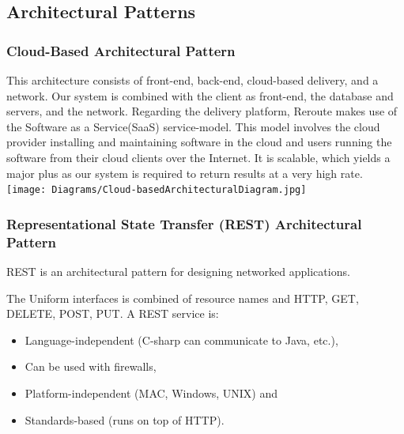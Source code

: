 \documentclass[a4paper,10pt]{article}
\begin{document}
	\subsection{Architectural Patterns}
	\subsubsection{Cloud-Based Architectural Pattern}
	This architecture consists of front-end, back-end, cloud-based delivery, and a network.
	Our system is combined with the client as front-end, the database and servers, and the network. 
	Regarding the delivery platform, Reroute makes use of the Software as a Service(SaaS) service-model. This model involves
	the cloud provider installing and maintaining software in the cloud and users running the software from their cloud clients
	over the Internet. It is scalable, which yields a major plus as our system is required to return results at a very high rate.\\
	
	\texttt{[image: Diagrams/Cloud-basedArchitecturalDiagram.jpg]}\\

	\subsubsection{Representational State Transfer (REST) Architectural Pattern}
	REST is an architectural pattern for designing networked applications.

The Uniform interfaces is combined of resource names and HTTP, GET, DELETE, POST, PUT.
A REST service is:
\begin{itemize}
	\item Language-independent (C-sharp can communicate to Java, etc.),
	\item Can be used with firewalls,
	\item Platform-independent (MAC, Windows, UNIX) and
	\item Standards-based (runs on top of HTTP).
\end{itemize}
\end{document}
